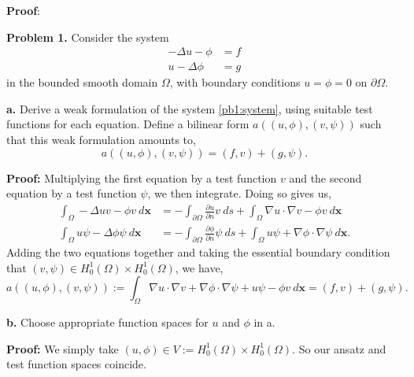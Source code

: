 \documentclass[11pt]{article}
\newcommand{\bs}{\boldsymbol}
\begin{document}
\vskip 2cm




{\bf Proof}: 


\vskip 2cm


\textbf{Problem 1.} Consider the system
\begin{equation}
\begin{split} \label{pb1:system}
    -\Delta u - \phi &= f \\
    u - \Delta \phi &= g
\end{split}
\end{equation}
in the bounded smooth domain $\Omega$, with boundary conditions $u = \phi = 0$ on $\partial \Omega$.

\vskip 1cm

\textbf{a.} Derive a weak formulation of the system \eqref{pb1:system}, using suitable test functions for each equation.
Define a bilinear form $a((u,\phi),(v,\psi))$ such that this weak formulation amounts to,
\begin{equation}
    a((u,\phi),(v,\psi)) = (f,v) + (g,\psi).
\end{equation}

\vskip 1cm

\textbf{Proof:} Multiplying the first equation by a test function $v$ and the second equation by a test function $\psi$, we then integrate.
Doing so gives us,
\begin{align*}
	\int_\Omega -\Delta u v - \phi v \: d\bs{x} &= -\int_{\partial \Omega} \frac{\partial u}{\partial n} v \: ds + \int_\Omega \nabla u \cdot \nabla v - \phi v \: d\bs{x} \\
	\int_\Omega u \psi - \Delta \phi \psi \: d\bs{x} &= - \int_{\partial \Omega} \frac{\partial \phi}{\partial n} \psi \: ds + \int_\Omega u\psi + \nabla \phi \cdot \nabla \psi \: d\bs{x}.
\end{align*}
Adding the two equations together and taking the essential boundary condition that $(v,\psi) \in H^1_0(\Omega)\times H^1_0(\Omega)$, we have,
\begin{equation}
	a((u,\phi),(v,\psi)) := \int_\Omega \nabla u \cdot \nabla v + \nabla \phi \cdot \nabla \psi + u\psi - \phi v \: d\bs{x} = (f,v) + (g,\psi).
\end{equation}



\vskip 2cm


\textbf{b.} Choose appropriate function spaces for $u$ and $\phi$ in a.

\vskip 1cm

\textbf{Proof:} We simply take $(u, \phi) \in V := H^1_0(\Omega)\times H^1_0(\Omega)$.
So our ansatz and test function spaces coincide. 
\end{document}
